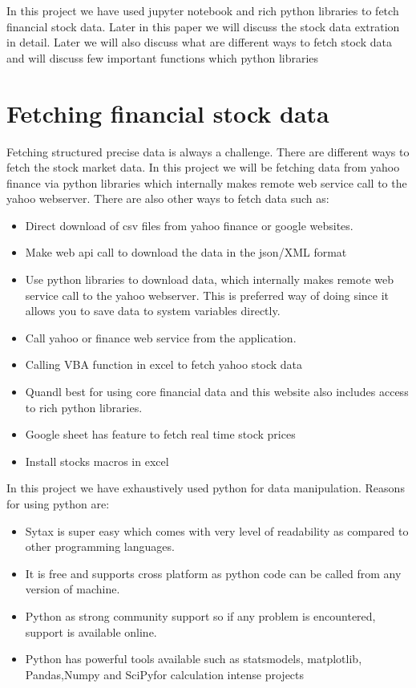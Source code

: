 \indent
In this project we have used jupyter notebook and rich python libraries to fetch financial stock data. Later in this paper we will discuss the stock data 
extration in detail. Later we will also discuss what are different ways to fetch stock data and will discuss few important functions which python libraries 
 
\section{Fetching financial stock data}

Fetching structured precise data is always a challenge. There are different ways to fetch the stock market data. In this project we will be fetching data from yahoo finance via python libraries which internally makes 
remote web service call to the yahoo webserver. There are also other ways to fetch data such as:

\begin{itemize}
  \item Direct download of csv files from yahoo finance or google websites.
  \item Make web api call to download the data in the json/XML format
  \item Use python libraries to download data, which internally makes remote web service call to the yahoo webserver. This is preferred way of doing since it allows you to save data to system variables directly. 
  \item Call yahoo or finance web service from the application. 
  \item Calling VBA function in excel to fetch yahoo stock data 
  \item Quandl best for using core financial data and this website also includes access to rich python libraries. 
  \item Google sheet has feature to fetch real time stock prices
  \item Install stocks macros in excel 
\end{itemize}

In this project we have exhaustively used python for data manipulation. Reasons for using python are:

\begin{itemize}
  \item Sytax is super easy which comes with very level of readability as compared to other programming languages.
  \item It is free and supports cross platform as python code can be called from any version of machine.
  \item Python as strong community support so if any problem is encountered, support is available online. 
  \item Python has powerful tools available such as statsmodels, matplotlib, Pandas,Numpy and SciPyfor calculation intense projects
\end{itemize}

